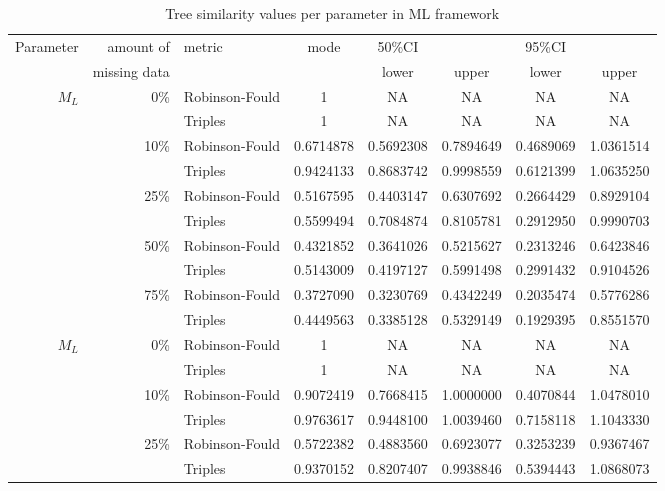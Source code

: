 \documentclass[12pt,letterpaper]{article}
\begin{document}
\begin{table}
\caption{Tree similarity values per parameter in ML framework}
\centering
\begin{tabular}{rrlccccc}
    \hline
    Parameter & amount of    & metric & mode & 50\%CI &       & 95\%CI &       \\
              & missing data &        &      & lower  & upper & lower  & upper \\
    \hline
    $M_L$     & 0\%          & Robinson-Fould & 1 & NA  & NA & NA  & NA \\
              &              & Triples        & 1 & NA  & NA & NA  & NA \\
              & 10\%         & Robinson-Fould & 0.6714878 & 0.5692308  & 0.7894649 & 0.4689069  & 1.0361514 \\ %
              &              & Triples        & 0.9424133 & 0.8683742  & 0.9998559 & 0.6121399  & 1.0635250 \\
              & 25\%         & Robinson-Fould & 0.5167595 & 0.4403147  & 0.6307692 & 0.2664429  & 0.8929104 \\
              &              & Triples        & 0.5599494 & 0.7084874  & 0.8105781 & 0.2912950  & 0.9990703 \\
              & 50\%         & Robinson-Fould & 0.4321852 & 0.3641026  & 0.5215627 & 0.2313246  & 0.6423846 \\
              &              & Triples        & 0.5143009 & 0.4197127  & 0.5991498 & 0.2991432  & 0.9104526 \\
              & 75\%         & Robinson-Fould & 0.3727090 & 0.3230769  & 0.4342249 & 0.2035474  & 0.5776286 \\
              &              & Triples        & 0.4449563 & 0.3385128  & 0.5329149 & 0.1929395  & 0.8551570 \\
    $M_L$     & 0\%          & Robinson-Fould & 1 & NA  & NA & NA  & NA \\
              &              & Triples        & 1 & NA  & NA & NA  & NA \\
              & 10\%         & Robinson-Fould & 0.9072419 & 0.7668415  & 1.0000000 & 0.4070844  & 1.0478010 \\
              &              & Triples        & 0.9763617 & 0.9448100  & 1.0039460 & 0.7158118  & 1.1043330 \\
              & 25\%         & Robinson-Fould & 0.5722382 & 0.4883560  & 0.6923077 & 0.3253239  & 0.9367467 \\
              &              & Triples        & 0.9370152 & 0.8207407  & 0.9938846 & 0.5394443  & 1.0868073 \\

\end{tabular}
\end{table}
\end{document}
